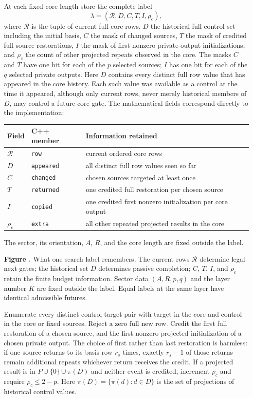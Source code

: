 \documentclass[11pt]{article}
\newcommand{\prooffigure}[3]{%
  \begin{center}
  \begin{minipage}{.98\linewidth}
  \centering
  \resizebox{\linewidth}{!}{}\par
  \refstepcounter{figure}\label{#2}%
  \small\textbf{Figure \thefigure.} #3
  \end{minipage}
  \end{center}}
\begin{document}
At each fixed core length store the complete label
\[\lambda=(\mathcal R,D,C,T,I,\rho_c),\]
where $\mathcal R$ is the tuple of current full core rows, $D$ the
historical full control set including the initial basis, $C$ the mask
of changed sources, $T$ the mask of credited full source restorations,
$I$ the mask of first nonzero private-output initializations, and $\rho_c$
the count of other projected repeats observed in the core.
The masks $C$ and $T$ have one bit for each of the $p$ selected sources;
$I$ has one bit for each of the $q$ selected private outputs.
Here $D$ contains every distinct full row value that has appeared in the
core history. Each such value was available as a control at the time it
appeared, although only current rows, never merely historical members of
$D$, may control a future core gate. The mathematical fields correspond
directly to the implementation:
\begin{center}\begin{tabular}{lp{.18\linewidth}p{.50\linewidth}}\toprule
Field&C++ member&Information retained\\\midrule
$\mathcal R$&\texttt{row}&current ordered core rows\\
$D$&\texttt{appeared}&all distinct full row values seen so far\\
$C$&\texttt{changed}&chosen sources targeted at least once\\
$T$&\texttt{returned}&one credited full restoration per chosen source\\
$I$&\texttt{copied}&one credited first nonzero initialization per core output\\
$\rho_c$&\texttt{extra}&all other repeated projected results in the core\\\bottomrule
\end{tabular}\end{center}
The sector, its orientation, $A$, $R$, and the core length are fixed outside
the label.
\prooffigure{search_state_anatomy}{fig:search-state}{What one search label
remembers. The current rows $\mathcal R$ determine legal next gates; the
historical set $D$ determines passive completion; $C$, $T$, $I$, and $\rho_c$
retain the finite budget information. Sector data $(A,R,p,q)$ and the layer
number $K$ are fixed outside the label. Equal labels at the same layer have
identical admissible futures.}

Enumerate every distinct control-target pair with target in the core
and control in the core or fixed sources. Reject a zero full new row.
Credit the first full restoration of a chosen source, and the first
nonzero projected initialization of a chosen private output. The choice
of first rather than last restoration is harmless: if one source returns
to its basis row $r_s$ times, exactly $r_s-1$ of those returns remain
additional repeats whichever return receives the credit. If a projected
result is in $P\cup\{0\}\cup\pi(D)$ and neither event is credited, increment
$\rho_c$ and require $\rho_c\le2-p$.
Here $\pi(D)=\{\pi(d):d\in D\}$ is the set of projections of historical
control values.
\end{document}
